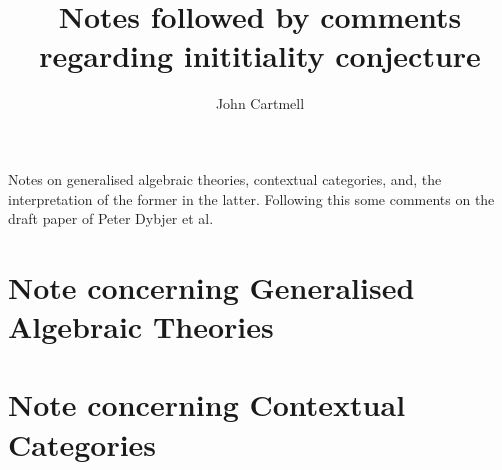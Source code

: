 \documentclass[10pt,a4paper]{article}
\theoremstyle{remark}
\begin{document}
\title{Notes followed by comments regarding inititiality conjecture}

\author{John Cartmell}

\maketitle

\newcommand{\gatU}{\gat[U]}
\newcommand{\gatUw}{\gatU\ }
\newcommand{\CofU}{\ccat[C](\gat[U])}
\newcommand{\KU}{K_{\gat[U]}}
\newcommand{\KUp}{K_{\gat[U']}}
\newcommand{\catCon}{\cat{Con}}
\newcommand{\catGAT}{\cat{GAT}}

\newcommand{\inlinedisplay}[1]
{
\setlength{\fboxsep}{1.5pt}
\setlength{\fboxrule}{0pt}
\fbox{$\displaystyle #1$}
}

\newcommand{\gatdisplayrule}[2]
{
\setlength{\fboxsep}{1pt}
\setlength{\fboxrule}{0pt}
\fbox{$\displaystyle \frac{#1}{#2}$}
}
\newcommand{\Isort}{I_{sort}}
\newcommand{\Iop}{I_{op}}
\newcommand {\Ihat}{\hat{I}}

\renewcommand{\crossx}[3]{#1 \underset{\tiny #3}{\cross} #2}
\newcommand{\fonestar}   {{f_1}\kern-.15em^*}
\newcommand{\ftwostar}   {{f_2}\kern-.15em^*}
\newcommand{\fjstar}     {{f_j}\kern-.2em^*}
\newcommand{\fjpstar}    {{f_{j-1}}\kern-.25em^*}
\newcommand{\smstar}{{s_m}\kern-.25em^*}
\newcommand{\sonestar}{{s_1}\kern-.15em^*}

\newcommand{\Trule} {T-rule\ }
\newcommand{\trule} {$\in$-rule\ }
\newcommand{\Teqrule} {T=-rule\ }
\newcommand{\teqrule} {$\in=$-rule\ }

\newcommand{\genericAintroductoryrule} {\gatdisplayrule{\xDelta{n}}{\isT{A(\xn}}}
\newcommand{\genericfintroductoryrule}  {\gatdisplayrule{\xDelta{n}}{\ofT{f(\xn)}{\Delta}}}


Notes on  generalised algebraic theories, contextual categories, and, the interpretation of the former in the latter. Following this some comments on the draft paper of Peter Dybjer et al. 

\section{Note concerning Generalised Algebraic Theories}
%

\section{Note concerning Contextual Categories}
%
\end{document}
